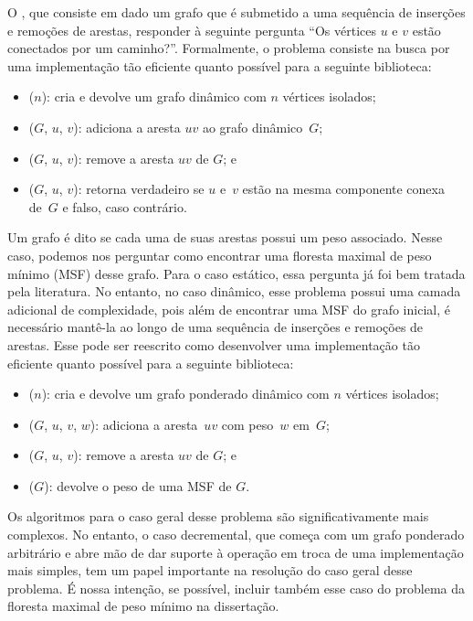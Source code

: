 O , que consiste em dado um grafo que é submetido a uma sequência de inserções e remoções de arestas, responder à seguinte pergunta “Os vértices $u$ e $v$ estão conectados por um caminho?”. Formalmente, o problema consiste na busca por uma implementação tão eficiente quanto possível para a seguinte biblioteca: 
\begin{itemize}
\item \dymGraphCreate($n$): cria e devolve um grafo dinâmico com $n$ vértices isolados;
\item \dymGraphAddEdge($G$, $u$, $v$): adiciona a aresta $uv$ ao grafo dinâmico~$G$;
\item \dymGraphDelEdge($G$, $u$, $v$): remove a aresta $uv$ de $G$; e
\item \dymGraphQuery($G$, $u$, $v$): retorna verdadeiro se $u$ e~$v$ estão na mesma componente conexa de~$G$ e falso, caso contrário.
\end{itemize}

Um grafo é dito  se cada uma de suas arestas possui um peso associado. Nesse caso, podemos nos perguntar como encontrar uma floresta maximal de peso mínimo (MSF) desse grafo. Para o caso estático, essa pergunta já foi bem tratada pela literatura. No entanto, no caso dinâmico, esse problema possui uma camada adicional de complexidade, pois além de encontrar uma MSF do grafo inicial, é necessário mantê-la ao longo de uma sequência de inserções e remoções de arestas. Esse  pode ser reescrito como desenvolver uma implementação tão eficiente quanto possível para a seguinte biblioteca:
\begin{itemize}
\item \MSFCreate($n$): cria e devolve um grafo ponderado dinâmico com $n$ vértices isolados;
\item \MSFaddEdge($G$, $u$, $v$, $w$): adiciona a aresta~$uv$ com peso~$w$ em~$G$;
\item \MSFdelEdge($G$, $u$, $v$): remove a aresta $uv$ de $G$; e
\item \MSFweight($G$): devolve o peso de uma MSF de $G$.
\end{itemize}

Os algoritmos para o caso geral desse problema são significativamente mais complexos. No entanto, o caso decremental, que começa com um grafo ponderado arbitrário e abre mão de dar suporte à operação \MSFaddEdge{} em troca de uma implementação mais simples, tem um papel importante na resolução do caso geral desse problema.  É nossa intenção, se possível, incluir também esse caso do problema da floresta maximal de peso mínimo na dissertação.

